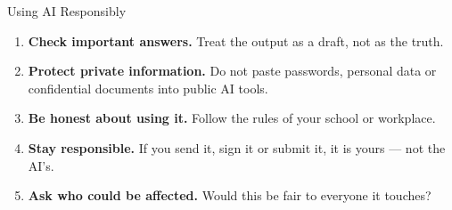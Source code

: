\begin{frame}{Using AI Responsibly}
    \begin{enumerate}
        \setlength\itemsep{0.9em}
        \item \textbf{Check important answers.} Treat the output as a draft, not as the truth.
        \item \textbf{Protect private information.} Do not paste passwords, personal data or confidential documents into public AI tools.
        \item \textbf{Be honest about using it.} Follow the rules of your school or workplace.
        \item \textbf{Stay responsible.} If you send it, sign it or submit it, it is yours --- not the AI's.
        \item \textbf{Ask who could be affected.} Would this be fair to everyone it touches?
    \end{enumerate}
\end{frame}
